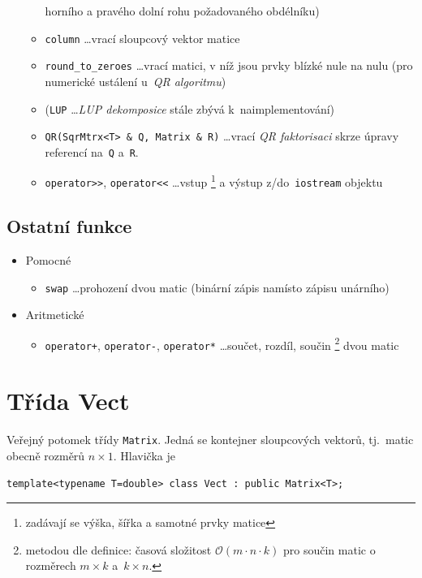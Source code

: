 \documentclass[11pt,a4paper]{article}
\begin{document}
\begin{itemize}
\begin{itemize}
      horního a pravého dolní rohu požadovaného obdélníku)
    \item \verb~column~ \ldots vrací sloupcový vektor matice
    \item \verb~round_to_zeroes~ \ldots vrací matici, v níž jsou prvky blízké
      nule na nulu  (pro numerické ustálení
      u~\emph{QR algoritmu\/})
    \item (\verb~LUP~ \ldots \emph{LUP dekomposice\/} stále zbývá
      k~naimplementování)
    \item \verb~QR(SqrMtrx<T> & Q, Matrix & R)~ \ldots vrací \emph{QR
    faktorisaci\/} skrze úpravy referencí na~\verb~Q~ a~\verb~R~.
    \item \verb~operator>>~, \verb~operator<<~ \ldots vstup\thinspace%
      \footnote{zadávají se výška, šířka a samotné prvky matice}
      a výstup z/do~\verb~iostream~ objektu
  \end{itemize}
\end{itemize}

\subsection{Ostatní funkce}

\begin{itemize}
\item Pomocné
  \begin{itemize}
  \item \verb~swap~ \ldots prohození dvou matic (binární zápis namísto
    zápisu unárního)
  \end{itemize}
\item Aritmetické
  \begin{itemize}
  \item \verb~operator+~, \verb~operator-~, \verb~operator*~ \ldots součet,
    rozdíl, součin\thinspace%
    \footnote{metodou dle definice: časová složitost $\mathcal{O}(m \cdot n
    \cdot k)$ pro součin matic o rozměrech $m \times k$ a~$k \times n$.}
    dvou matic
  \end{itemize}
\end{itemize}

\section{Třída Vect}

Veřejný potomek třídy \verb=Matrix=.
Jedná se kontejner sloupcových vektorů, tj.~matic obecně rozměrů $n\times 1$.
Hlavička je
\begin{verbatim}
template<typename T=double> class Vect : public Matrix<T>;
\end{verbatim}
\end{document}
